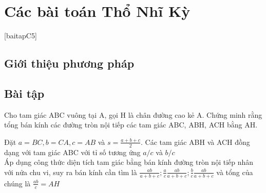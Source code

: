 
\chapter{Các bài toán Thổ Nhĩ Kỳ}
\minitoc
\thispagestyle{empty}
[baitapC5]
\vspace*{1cm}

\section{Giới thiệu phương pháp}


\section{Bài tập}

\begin{baitap}
Cho tam giác ABC vuông tại A, gọi H là chân đường cao kẻ A. Chứng minh rằng tổng bán kính các đường tròn nội tiếp các tam giác ABC, ABH, ACH bằng AH.



\begin{loigiai5}
Đặt $a=BC, b=CA, c=AB$ và $s = \frac{{a + b + c}}{2}$. Các tam giác ABH và ACH đồng dạng với tam giác ABC với tỉ số tương ứng $a/c$ và $b/c$\\
Áp dụng công thức diện tích tam giác bằng bán kính đường tròn nội tiếp nhân với nửa chu vi, suy ra bán kính cần tìm là $\frac{{ab}}{{a + b + c}};\frac{a}{c}\frac{{ab}}{{a + b + c}};\frac{b}{c}\frac{{ab}}{{a + b + c}}$ và tổng của chúng là $\frac{{ab}}{c} = AH$
\end{loigiai5}
\end{baitap}

